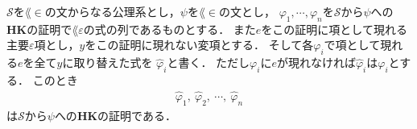 	\begin{screen}
		\begin{metathm}
		\label{metathm:Henkin_expansion_2_lemma}
			$\mathscr{S}$を$\lang{\in}$の文からなる公理系とし，$\psi$を$\lang{\in}$の文とし，
			$\varphi_{1},\cdots,\varphi_{n}$を$\mathscr{S}$から$\psi$への
			{\bf HK}の証明で$\lang{\varepsilon}$の式の列であるものとする．
			また$e$をこの証明に項として現れる\footnotemark
			主要$\varepsilon$項とし，$y$をこの証明に現れない変項とする．
			そして各$\varphi_{i}$で項として現れる$e$を全て$y$に取り替えた式を
			$\widehat{\varphi}_{i}$と書く．
			ただし$\varphi_{i}$に$e$が現れなければ$\widehat{\varphi}_{i}$は$\varphi_{i}$とする．
			このとき
			\begin{align}
				\widehat{\varphi}_{1},\ \widehat{\varphi}_{2},\ 
				\cdots,\ \widehat{\varphi}_{n}
			\end{align}
			は$\mathscr{S}$から$\psi$への{\bf HK}の証明である．
		\end{metathm}
	\end{screen}
	
	
